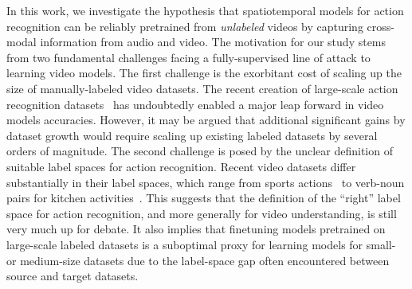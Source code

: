 \documentclass{article}
\begin{document}
In this work, we investigate the hypothesis that spatiotemporal models for action recognition can be reliably pretrained from {\em unlabeled} videos by capturing cross-modal information from audio and video. The motivation for our study stems from two fundamental challenges facing a fully-supervised line of attack to learning video models. The first challenge is the exorbitant cost of scaling up the size of manually-labeled video datasets. The recent creation of large-scale action recognition datasets~\cite{caba2015activitynet,something_something,Sports1M,kinetics} has undoubtedly enabled a major leap forward in video models accuracies. However, it may be argued that additional significant gains by dataset growth would require scaling up existing labeled datasets by several orders of magnitude. 
The second challenge is posed by the unclear definition of suitable label spaces for action recognition. Recent video datasets differ substantially in their label spaces, which range from sports actions~\cite{Sports1M} to verb-noun pairs for kitchen activities~\cite{Damen2018EPICKITCHENS}. This suggests that the definition of the ``right'' label space for action recognition, and more generally for video understanding, is still very much up for debate. It also implies that finetuning models pretrained on large-scale labeled datasets is a suboptimal proxy for learning models for small- or medium-size datasets due to the label-space gap often encountered between source and target datasets. 
\end{document}
